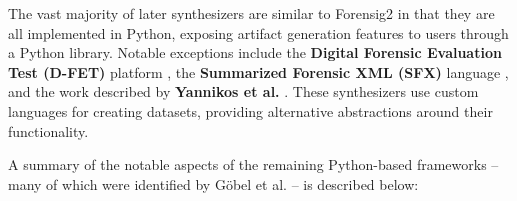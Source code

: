 \documentclass[final,5p,times,twocolumn]{elsarticle}
\begin{document}
The vast majority of later synthesizers are similar to Forensig2 in that
they are all implemented in Python, exposing artifact generation
features to users through a Python library. Notable exceptions include
the \textbf{Digital Forensic Evaluation Test (D-FET)} platform
\cite{williamCloudbasedDigitalForensics2011}, the \textbf{Summarized
Forensic XML (SFX)} language
\cite{russellForensicImageDescription2012}, and the work described
by \textbf{Yannikos et al.} \cite{yannikosDataCorporaDigital2014}.
These synthesizers use custom languages for creating datasets, providing
alternative abstractions around their functionality.

A summary of the notable aspects of the remaining Python-based
frameworks -- many of which were identified by Göbel et al.
\cite{gobelForTraceHolisticForensic2022} -- is described below:
\end{document}
